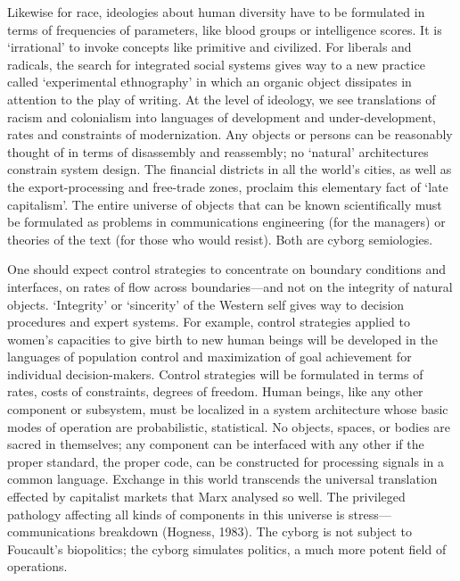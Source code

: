 \documentclass[DIV=12,%
               BCOR=10mm,%
               headinclude=false,%
               footinclude=false,open=any,%
               fontsize=11pt,%
               twoside,%
               paper=210mm:11in]%
               {scrbook}
\begin{document}
Likewise for race, ideologies about human diversity have to be formulated in terms of frequencies of parameters, like blood groups or intelligence scores. It is ‘irrational’ to invoke concepts like primitive and civilized. For liberals and radicals, the search for integrated social systems gives way to a new practice called ‘experimental ethnography’ in which an organic object dissipates in attention to the play of writing. At the level of ideology, we see translations of racism and colonialism into languages of development and under-development, rates and constraints of modernization. Any objects or persons can be reasonably thought of in terms of disassembly and reassembly; no ‘natural’ architectures constrain system design. The financial districts in all the world’s cities, as well as the export-processing and free-trade zones, proclaim this elementary fact of ‘late capitalism’. The entire universe of objects that can be known scientifically must be formulated as problems in communications engineering (for the managers) or theories of the text (for those who would resist). Both are cyborg semiologies.


One should expect control strategies to concentrate on boundary conditions and interfaces, on rates of flow across boundaries—and not on the integrity of natural objects. ‘Integrity’ or ‘sincerity’ of the Western self gives way to decision procedures and expert systems. For example, control strategies applied to women’s capacities to give birth to new human beings will be developed in the languages of population control and maximization of goal achievement for individual decision-makers. Control strategies will be formulated in terms of rates, costs of constraints, degrees of freedom. Human beings, like any other component or subsystem, must be localized in a system architecture whose basic modes of operation are probabilistic, statistical. No objects, spaces, or bodies are sacred in themselves; any component can be interfaced with any other if the proper standard, the proper code, can be constructed for processing signals in a common language. Exchange in this world transcends the universal translation effected by capitalist markets that Marx analysed so well. The privileged pathology affecting all kinds of components in this universe is stress—communications breakdown (Hogness, 1983). The cyborg is not subject to Foucault’s biopolitics; the cyborg simulates politics, a much more potent field of operations.
\end{document}
